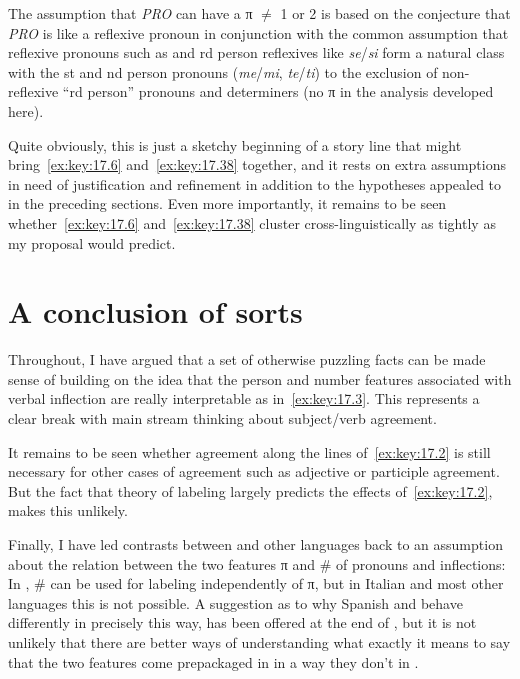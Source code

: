 \documentclass[output=paper]{langsci/langscibook}
\begin{document}
The assumption that \emph{PRO} can have a π ${\neq}$ 1 or 2 is based on
the conjecture that \emph{PRO} is like a reflexive pronoun in conjunction
with the common assumption that reflexive pronouns such as  and
\Third{}rd person reflexives like \emph{se}/\emph{si} form a natural class
with the \First{}st and \Second{}nd person pronouns (\emph{me}/\emph{mi},
\emph{te}/\emph{ti}) to the exclusion of non-reflexive ``\Third{}rd
person'' pronouns and determiners (no π in the analysis developed here).

Quite obviously, this is just a sketchy beginning of a story line that might
bring~\eqref{ex:key:17.6} and~\eqref{ex:key:17.38} together, and it rests on extra
assumptions in need of justification and refinement in addition to the
hypotheses appealed to in the preceding sections. Even more importantly, it
remains to be seen whether~\eqref{ex:key:17.6} and~\eqref{ex:key:17.38} cluster
cross-linguistically as tightly as my proposal would predict.

\section{A conclusion of sorts}\label{sec:key:17.9}

Throughout, I have argued that a set of otherwise puzzling facts can be made
sense of building on the idea that the person and number features associated
with verbal inflection are really interpretable as in~\eqref{ex:key:17.3}. This
represents a clear break with main stream thinking about subject/verb
agreement.

It remains to be seen whether agreement along the lines of~\eqref{ex:key:17.2}
is still necessary for other cases of agreement such as adjective or participle
agreement. But the fact that  theory of
labeling largely predicts the effects of~\eqref{ex:key:17.2},
makes this unlikely.

Finally, I have led contrasts between  and other languages back to an
assumption about the relation between the two features π and \# of pronouns and
inflections: In , \# can be used for labeling independently of π, but in
Italian and most other languages this is not possible. A suggestion as to why
Spanish and  behave differently in precisely this way, has been offered
at the end of , but it is not unlikely that there are better ways of
understanding what exactly it means to say that the two features come
prepackaged in  in a way they don’t in .

\printchapterglossary{}

{\sloppy
\printbibliography[heading=subbibliography,notkeyword=this]
}
\end{document}
